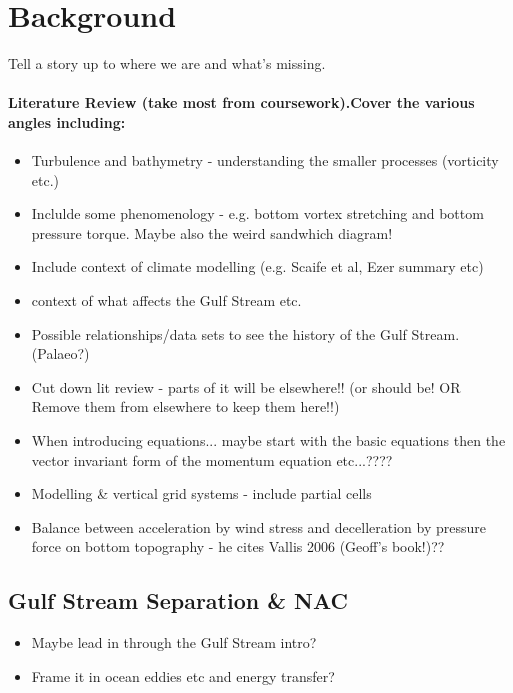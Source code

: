 \documentclass[..\EOYR.tex]{subfiles}
\begin{document}
\section{Background}
Tell a story up to where we are and what's missing.
\paragraph{Literature Review (take most from coursework).Cover the various angles including:}
\begin{itemize}
  \item Turbulence and bathymetry - understanding the smaller processes (vorticity etc.) \citep{Tansley2001} \citep{Nikurashin2012a}
  \item Inclulde some phenomenology - e.g. bottom vortex stretching and bottom pressure torque. Maybe also the weird sandwhich diagram!
  \item Include context of climate modelling (e.g. Scaife et al, Ezer summary etc)
  \item context of what affects the Gulf Stream etc.
  \item Possible relationships/data sets to see the history of the Gulf Stream. (Palaeo?) \citep{Ezer2015}
  \item Cut down lit review - parts of it will be elsewhere!! (or should be! OR Remove them from elsewhere to keep them here!!)
  \item When introducing equations... maybe start with the basic equations then the vector invariant form of the momentum equation etc...????
  \item Modelling \& vertical grid systems - include partial cells
  \item Balance between acceleration by wind stress and decelleration by pressure force on bottom topography \citep{NaveiraGarabato2013} - he cites Vallis 2006 (Geoff's book!)??
\end{itemize}


\subsection{Gulf Stream Separation \& NAC}
\begin{itemize}
    \item Maybe lead in through the Gulf Stream intro?
    \item Frame it in ocean eddies etc and energy transfer?
\end{itemize}
\end{document}
